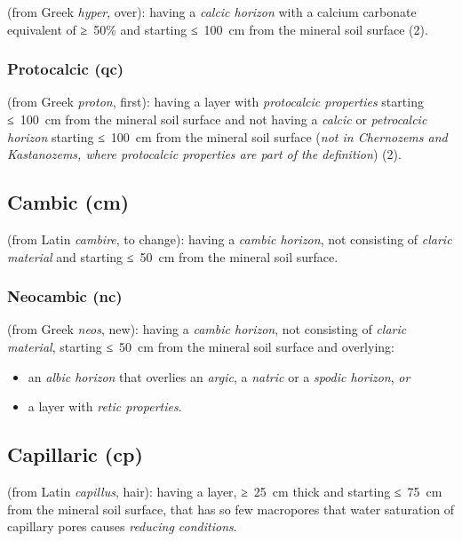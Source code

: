 \documentclass[
  letterpaper,
  DIV=11,
  numbers=noendperiod]{scrreprt}
\providecommand{\tightlist}{%
  \setlength{\itemsep}{0pt}\setlength{\parskip}{0pt}}\usepackage{longtable,booktabs,array}
\begin{document}
(from Greek \emph{hyper}, over): having a \emph{calcic horizon} with a
calcium carbonate equivalent of ≥~50\% and starting ≤~100~cm from the
mineral soil surface (2).

\hypertarget{protocalcic-qc}{%
\subsubsection{Protocalcic (qc)}\label{protocalcic-qc}}

(from Greek \emph{proton}, first): having a layer with \emph{protocalcic
properties} starting ≤~100~cm from the mineral soil surface and not
having a \emph{calcic} or \emph{petrocalcic horizon} starting ≤~100~cm
from the mineral soil surface (\emph{not in Chernozems and Kastanozems,
where protocalcic properties are part of the definition}) (2).

\hypertarget{cambic-cm}{%
\subsection{Cambic (cm)}\label{cambic-cm}}

(from Latin \emph{cambire}, to change): having a \emph{cambic horizon},
not consisting of \emph{claric material} and starting ≤~50~cm from the
mineral soil surface.

\hypertarget{neocambic-nc}{%
\subsubsection{Neocambic (nc)}\label{neocambic-nc}}

(from Greek \emph{neos}, new): having a \emph{cambic horizon}, not
consisting of \emph{claric material}, starting ≤~50~cm from the mineral
soil surface and overlying:

\begin{itemize}
\tightlist
\item
  an \emph{albic horizon} that overlies an \emph{argic}, a \emph{natric}
  or a \emph{spodic horizon}, \emph{or}
\item
  a layer with \emph{retic properties}.
\end{itemize}

\hypertarget{capillaric-cp}{%
\subsection{Capillaric (cp)}\label{capillaric-cp}}

(from Latin \emph{capillus}, hair): having a layer, ≥~25~cm thick and
starting ≤~75~cm from the mineral soil surface, that has so few
macropores that water saturation of capillary pores causes
\emph{reducing conditions}.
\end{document}
